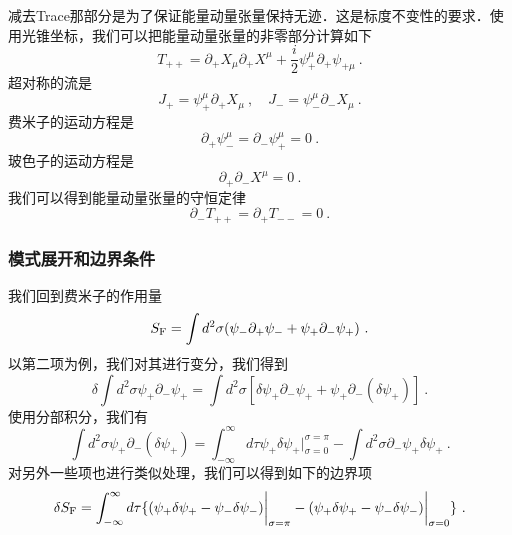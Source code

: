 减去Trace那部分是为了保证能量动量张量保持无迹．这是标度不变性的要求．使用光锥坐标，我们可以把能量动量张量的非零部分计算如下
\begin{equation}
T_{++} = \partial_+X_\mu\partial_+X^\mu + \frac{i}{2} \psi^\mu_+ \partial_+ \psi_{+\mu}~.
\end{equation}
超对称的流是
\begin{equation}
J_+ = \psi^\mu_+ \partial_+ X_\mu~, \quad J_- = \psi^\mu_- \partial_- X_\mu ~.
\end{equation}
费米子的运动方程是
\begin{equation}
\partial_+\psi^\mu_- = \partial_- \psi^\mu_+ = 0~.
\end{equation}
玻色子的运动方程是
\begin{equation}
\partial_+\partial_- X^\mu = 0~.
\end{equation}
我们可以得到能量动量张量的守恒定律
\begin{equation}
\partial_- T_{++} = \partial_+ T_{--} = 0~.
\end{equation}

\subsubsection{模式展开和边界条件}
我们回到费米子的作用量
\begin{equation}
S_{\rm F} = \int d^2\sigma (\psi_-\partial_+\psi_-+\psi_+\partial_-\psi_+)~.
\end{equation}
以第二项为例，我们对其进行变分，我们得到
\begin{equation}
\delta \int d^2\sigma\psi_+ \partial_- \psi_+ = \int d^2\sigma [\delta\psi_+\partial_-\psi_+ + \psi_+ \partial_- (\delta\psi_+)]~.
\end{equation}
使用分部积分，我们有
\begin{equation}
\int d^2\sigma \psi_+ \partial_- (\delta\psi_+) = \int_{-\infty}^{\infty} d \tau \psi_+ \delta\psi_+ \bigg|_{\sigma = 0}^{\sigma = \pi} - \int d^2\sigma \partial_-\psi_+\delta\psi_+~.
\end{equation}
对另外一些项也进行类似处理，我们可以得到如下的边界项
\begin{equation}
\delta S_{\rm F} = \int_{-\infty}^{\infty} d\tau \{ (\psi_+\delta \psi_+ - \psi_-\delta \psi_-) \bigg|_{\sigma = \pi} - (\psi_+\delta\psi_+ - \psi_-\delta\psi_-) \bigg|_{\sigma = 0} \}~.
\end{equation}








































